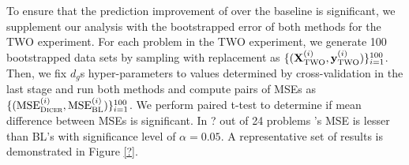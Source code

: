 To ensure that the prediction improvement of \dc{} over the baseline is significant, we supplement our analysis with the bootstrapped error of both methods for the TWO experiment.
For each problem in the TWO experiment, we generate 100 bootstrapped data sets by sampling with replacement as $\{(\mathbf{X}^{(i)}_{\text{TWO}}, \mathbf{y}^{(i)}_{\text{TWO}})\}_{i=1}^{100}$.  
Then, we fix $d_g$s hyper-parameters to values determined by cross-validation in the last stage and run both methods and compute pairs of MSEs as $\{(\text{MSE}^{(i)}_{\text{{\sc Dicer}}}, \text{MSE}^{(i)}_{\text{BL}})\}_{i=1}^{100}$. We perform paired t-test to determine if mean difference between MSEs is significant. In ? out of 24 problems \dc's MSE is lesser than BL's with significance level of $\alpha = 0.05$. A representative set of results is demonstrated in Figure \ref{?}. 

